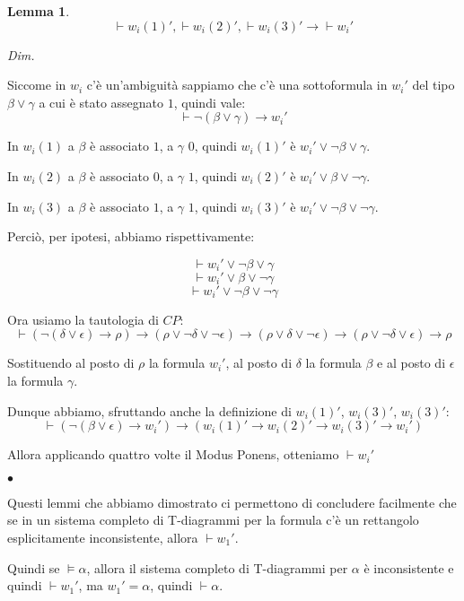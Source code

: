 \documentclass[a4paper, titlepage, 12pt]{report}
\newtheorem{lemma}{Lemma}[chapter]
\newenvironment{proof}
    {\textit{Dim.}
    }
    {\begin{flushright}$\bullet$\end{flushright}
    }
\begin{document}
\begin{lemma}
$$\vdash w_i(1)', \vdash w_i(2)', \vdash w_i(3)' \rightarrow \vdash w_i'$$
\end{lemma}

\begin{proof}

Siccome in $w_i$ c'è un'ambiguità sappiamo che c'è una sottoformula in $w_i'$
del tipo $\beta \lor \gamma$ a cui è stato assegnato $1$, quindi vale:
$$\vdash \neg (\beta \lor \gamma) \rightarrow w_i'$$

In $w_i(1)$ a $\beta$ è associato $1$, a $\gamma$ $0$, quindi $w_i(1)'$ è $w_i' \lor \neg \beta \lor \gamma$.

In $w_i(2)$ a $\beta$ è associato $0$, a $\gamma$ $1$, quindi $w_i(2)'$ è $w_i' \lor \beta \lor \neg \gamma$.

In $w_i(3)$ a $\beta$ è associato $1$, a $\gamma$ $1$, quindi $w_i(3)'$ è $w_i' \lor \neg \beta \lor \neg \gamma$.

Perciò, per ipotesi, abbiamo rispettivamente:

$$\vdash w_i' \lor \neg \beta \lor \gamma$$
$$\vdash w_i' \lor \beta \lor \neg \gamma$$
$$\vdash w_i' \lor \neg \beta \lor \neg \gamma$$

Ora usiamo la tautologia di $CP$:
$$\vdash (\neg (\delta \lor \epsilon) \rightarrow \rho) \rightarrow
         (\rho \lor \neg \delta \lor \neg \epsilon) \rightarrow (\rho \lor \delta \lor \neg \epsilon)
           \rightarrow (\rho \lor \neg \delta \lor \epsilon) \rightarrow \rho$$

Sostituendo al posto di $\rho$ la formula $w_i'$, al posto di $\delta$ la formula $\beta$
e al posto di $\epsilon$ la formula $\gamma$.

Dunque abbiamo, sfruttando anche la definizione di $w_i(1)'$, $w_i(3)'$, $w_i(3)'$:
$$\vdash (\neg (\beta \lor \epsilon) \rightarrow w_i') \rightarrow
         (w_i(1)' \rightarrow w_i(2)' \rightarrow w_i(3)' \rightarrow w_i')$$

Allora applicando quattro volte il Modus Ponens, otteniamo $\vdash w_i'$
\end{proof}

Questi lemmi che abbiamo dimostrato ci permettono di concludere facilmente
che se in un sistema completo di T-diagrammi per la formula c'è un rettangolo esplicitamente inconsistente,
allora $\vdash w_1'$.

Quindi se $\vDash \alpha$, allora il sistema completo di T-diagrammi per $\alpha$ è inconsistente
e quindi $\vdash w_1'$, ma $w_1' = \alpha$, quindi $\vdash \alpha$.
\end{document}
